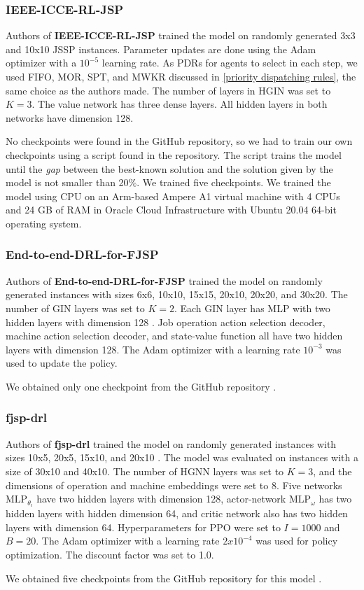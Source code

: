 \subsubsection{IEEE-ICCE-RL-JSP}
Authors of \textbf{IEEE-ICCE-RL-JSP} trained the model on randomly generated 3x3 and 10x10 JSSP instances. Parameter updates are done using the Adam optimizer with a $10^{-5}$ learning rate. As PDRs for agents to select in each step, we used FIFO, MOR, SPT, and MWKR discussed in \ref{priority dispatching rules}, the same choice as the authors made. The number of layers in HGIN was set to $K=3$. The value network has three dense layers. All hidden layers in both networks have dimension 128.
\par
No checkpoints were found in the GitHub repository\cite{github_ieee_icce_rl_jsp}, so we had to train our own checkpoints using a script found in the repository. The script trains the model until the \textit{gap} between the best-known solution and the solution given by the model is not smaller than 20$\%$. We trained five checkpoints. We trained the model using CPU on an Arm-based Ampere A1 virtual machine with 4 CPUs and 24 GB of RAM in Oracle Cloud Infrastructure with Ubuntu 20.04 64-bit operating system.

\subsubsection{End-to-end-DRL-for-FJSP}
Authors of \textbf{End-to-end-DRL-for-FJSP} trained the model on randomly generated instances with sizes 6x6, 10x10, 15x15, 20x10, 20x20, and 30x20. The number of GIN layers was set to $K = 2$. Each GIN layer has MLP with two hidden layers with dimension 128 \cite{LEI2022117796}. Job operation action selection decoder, machine action selection decoder, and state-value function all have two hidden layers with dimension 128. The Adam optimizer with a learning rate $10^{-3}$ was used to update the policy.
\par
We obtained only one checkpoint from the GitHub repository \cite{github_end_to_end_drl_for_fjsp}.

\subsubsection{fjsp-drl}
Authors of \textbf{fjsp-drl} trained the model on randomly generated instances with sizes 10x5, 20x5, 15x10, and 20x10 \cite{9826438}. The model was evaluated on instances with a size of 30x10 and 40x10. The number of HGNN layers was set to $K = 3$, and the dimensions of operation and machine embeddings were set to 8. Five networks $\text{MLP}_{\theta_i}$ have two hidden layers with dimension 128, actor-network $\text{MLP}_\omega$ has two hidden layers with hidden dimension 64, and critic network also has two hidden layers with dimension 64. Hyperparameters for PPO were set to $I = 1000$ and $B = 20$. The Adam optimizer with a learning rate $2x10^{-4}$ was used for policy optimization. The discount factor was set to 1.0.
\par
We obtained five checkpoints from the GitHub repository for this model \cite{github_fjsp_drl}.

